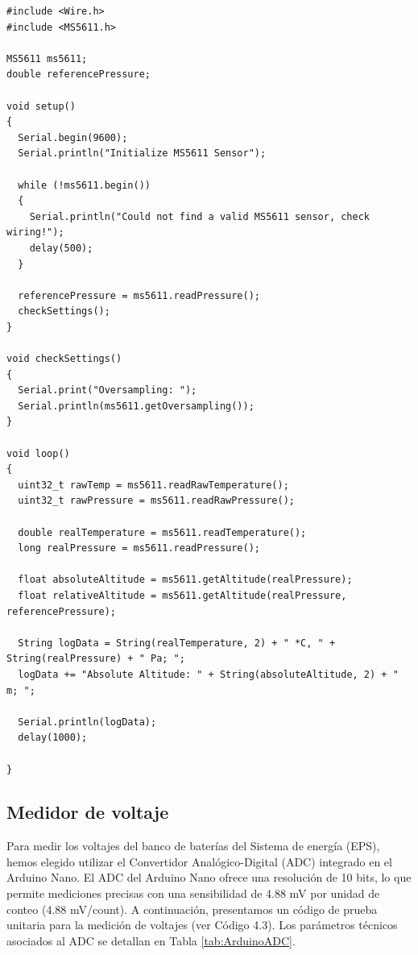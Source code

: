 \begin{lstlisting}[caption={Prueba unitario en sensor MS5611 desarrollado en Arduino IDE}, label={code:ms5611cod}]
#include <Wire.h>
#include <MS5611.h>

MS5611 ms5611;
double referencePressure;

void setup() 
{
  Serial.begin(9600);
  Serial.println("Initialize MS5611 Sensor");
  
  while (!ms5611.begin())
  {
    Serial.println("Could not find a valid MS5611 sensor, check wiring!");
    delay(500);
  }
  
  referencePressure = ms5611.readPressure();
  checkSettings();
}

void checkSettings()
{
  Serial.print("Oversampling: ");
  Serial.println(ms5611.getOversampling());
}

void loop()
{
  uint32_t rawTemp = ms5611.readRawTemperature();
  uint32_t rawPressure = ms5611.readRawPressure();
  
  double realTemperature = ms5611.readTemperature();
  long realPressure = ms5611.readPressure();
  
  float absoluteAltitude = ms5611.getAltitude(realPressure);
  float relativeAltitude = ms5611.getAltitude(realPressure, referencePressure);
  
  String logData = String(realTemperature, 2) + " *C, " + String(realPressure) + " Pa; ";
  logData += "Absolute Altitude: " + String(absoluteAltitude, 2) + " m; ";
  
  Serial.println(logData);
  delay(1000);

}
\end{lstlisting}



\subsection{Medidor de voltaje}

Para medir los voltajes del banco de baterías del Sistema de energía (EPS), hemos elegido utilizar el Convertidor Analógico-Digital (ADC) integrado en el Arduino Nano. El ADC del Arduino Nano ofrece una resolución de 10 bits, lo que permite mediciones precisas con una sensibilidad de 4.88 mV por unidad de conteo (4.88 mV/count). A continuación, presentamos un código de prueba unitaria para la medición de voltajes (ver Código 4.3). Los parámetros técnicos asociados al ADC se detallan en Tabla \ref{tab:ArduinoADC}.

